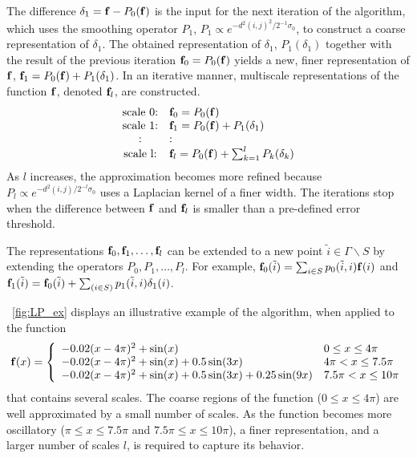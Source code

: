 The difference $\delta_1 = \mathbf{f}-P_0(\mathbf{f})$ is the input for the next iteration of the algorithm,
which uses the smoothing operator $P_1$, $P_1 \propto e^{-d^2(i, j)^2 / 2^{-1} \sigma_0}$, to construct a coarse representation of $\delta_1$.
%
The obtained representation of $\delta_1$, $P_1(\delta_1)$ together with the result of the previous iteration $\mathbf{f}_0 = P_0(\mathbf{f})$
yields a new, finer representation of $\mathbf{f}$, $\mathbf{f}_1 = P_0(\mathbf{f}) + P_1(\delta_1)$.
%
In an iterative manner, multiscale representations of the function $\mathbf{f}$, denoted $\mathbf{f}_l$, are constructed.
\begin{equation} \label{eq:LP_multi_scale}
 \begin{array}{cl}
\mbox{scale 0:} & \mathbf{f}_0 = P_0(\mathbf{f}) \\
\mbox{scale 1:} & \mathbf{f}_1 = P_0(\mathbf{f}) + P_1(\delta_1) \\
: & : \\
\mbox{scale l:} & \mathbf{f}_l = P_0(\mathbf{f}) + \sum_{k=1}^{l}P_k(\delta_k)\\
\end{array}
\end{equation}
As $l$ increases, the approximation becomes more refined because $P_l \propto e^{-d^2(i, j) / 2^{-l} \sigma_0}$ uses a Laplacian kernel of a finer width.
%
The iterations stop when the difference between $\mathbf{f}$ and $\mathbf{f}_l$ is smaller than a pre-defined error threshold.

The representations $\mathbf{f}_0, \mathbf{f}_1, \dots, \mathbf{f}_l$ can be extended to a new point $\tilde{i} \in \Gamma \backslash S $ by extending the operators $P_0, P_1,\ldots,P_l$.
%
For example, $\mathbf{f}_0(\tilde{i}) = \sum_{i \in S} p_0(\tilde{i}, i)\mathbf{f}(i)$ and
$\mathbf{f}_1(\tilde{i}) = \mathbf{f}_0(\tilde{i}) + \sum_{(i \in S)}p_1(\tilde{i}, i)\delta_1(i)$.

\fig~\ref{fig:LP_ex} displays an illustrative example of the algorithm, when applied to the function
 \begin{equation} \label{eq:LP_example}
\mathbf{f}(x) = \left\{
\begin{array}{l l}
-0.02(x-4\pi)^2 + \sin(x) &  0 \le x \le 4\pi \\
-0.02(x-4\pi)^2 + \sin(x) + 0.5 \sin(3x) &  4\pi < x \le 7.5 \pi \\
-0.02(x-4\pi)^2 + \sin(x) + 0.5 \sin(3x) +0.25 \sin(9x) &  7.5 \pi < x \le 10 \pi
\end{array}
\right.
\end{equation}
that contains several scales.
%
The coarse regions of the function ($0 \le x \le 4\pi$) are well approximated by a small number of scales.
%
As the function becomes more oscillatory ($\pi \le x \le 7.5\pi$ and $7.5\pi \le x \le 10\pi$),
a finer representation, and a larger number of scales  $l$, is required to capture its behavior.


